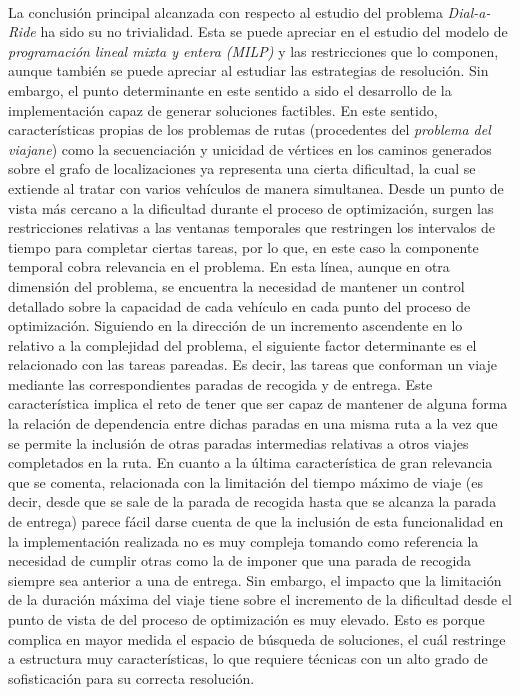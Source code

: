 \documentclass{subfiles}
\begin{document}
      \paragraph{}
      La conclusión principal alcanzada con respecto al estudio del problema \emph{Dial-a-Ride} ha sido su no trivialidad. Esta se puede apreciar en el estudio del modelo de \emph{programación lineal mixta y entera (MILP)} y las restricciones que lo componen, aunque también se puede apreciar al estudiar las estrategias de resolución. Sin embargo, el punto determinante en este sentido a sido el desarrollo de la implementación capaz de generar soluciones factibles. En este sentido, características propias de los problemas de rutas (procedentes del \emph{problema del viajane}) como la secuenciación y unicidad de vértices en los caminos generados sobre el grafo de localizaciones ya representa una cierta dificultad, la cual se extiende al tratar con varios vehículos de manera simultanea. Desde un punto de vista más cercano a la dificultad durante el proceso de optimización, surgen las restricciones relativas a las ventanas temporales que restringen los intervalos de tiempo para completar ciertas tareas, por lo que, en este caso la componente temporal cobra relevancia en el problema. En esta línea, aunque en otra dimensión del problema, se encuentra la necesidad de mantener un control detallado sobre la capacidad de cada vehículo en cada punto del proceso de optimización. Siguiendo en la dirección de un incremento ascendente en lo relativo a la complejidad del problema, el siguiente factor determinante es el relacionado con las tareas pareadas. Es decir, las tareas que conforman un viaje mediante las correspondientes paradas de recogida y de entrega. Este característica implica el reto de tener que ser capaz de mantener de alguna forma la relación de dependencia entre dichas paradas en una misma ruta a la vez que se permite la inclusión de otras paradas intermedias relativas a otros viajes completados en la ruta. En cuanto a la última característica de gran relevancia que se comenta, relacionada con la limitación del tiempo máximo de viaje (es decir, desde que se sale de la parada de recogida hasta que se alcanza la parada de entrega) parece fácil darse cuenta de que la inclusión de esta funcionalidad en la implementación realizada no es muy compleja tomando como referencia la necesidad de cumplir otras como la de imponer que una parada de recogida siempre sea anterior a una de entrega. Sin embargo, el impacto que la limitación de la duración máxima del viaje tiene sobre el incremento de la dificultad desde el punto de vista de del proceso de optimización es muy elevado. Esto es porque complica en mayor medida el espacio de búsqueda de soluciones, el cuál restringe a estructura muy características, lo que requiere técnicas con un alto grado de sofisticación para su correcta resolución.
\end{document}
